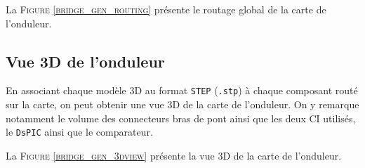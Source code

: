 		La \textsc{Figure \ref{bridge_gen_routing}} présente le routage
		global de la carte de l'onduleur.
		
		\subsection{Vue 3D de l'onduleur}
		
		En associant chaque modèle 3D au format \texttt{STEP} (\texttt{.stp})
		à chaque composant routé sur la carte, on peut obtenir une vue 3D
		de la carte de l'onduleur. On y remarque notamment le volume des 
		connecteurs bras de pont ainsi que les deux CI utilisés, le \texttt{DsPIC}
		ainsi que le comparateur.

		La \textsc{Figure \ref{bridge_gen_3dview}} présente la vue 3D
		de la carte de l'onduleur.
		
		\newpage
	
